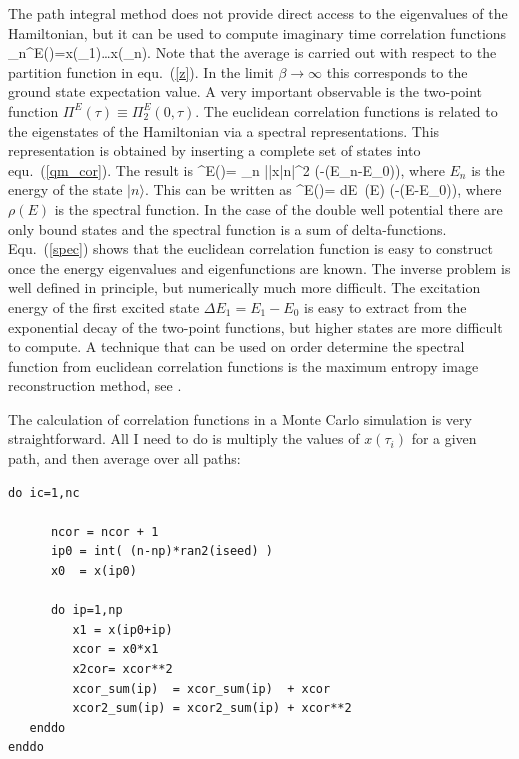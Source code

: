  The path integral method does not provide direct access to the eigenvalues
of the Hamiltonian, but it can be used to compute imaginary time correlation
functions
\be
\label{qm_cor}
 \Pi_n^E(\tau)=\langle x(\tau_1)\ldots x(\tau_n)\rangle.
\ee
Note that the average is carried out with respect to the partition 
function in equ.~(\ref{z}). In the limit $\beta\to\infty$ this 
corresponds to the ground state expectation value. A very important 
observable is the two-point function $\Pi^E(\tau)\equiv \Pi^E_2(0,\tau)$. 
The euclidean correlation functions is related to the eigenstates of 
the Hamiltonian via a spectral representations. This representation 
is obtained by inserting a complete set of states into 
equ.~(\ref{qm_cor}). The result is
\be 
\label{spec}
\Pi^E(\tau)= \sum_n ||x|n\rangle|^2 
 \exp(-(E_n-E_0)\tau),
\ee
where $E_n$ is the energy of the state $|n\rangle$. This can be written as
\be
\Pi^E(\tau)= \int dE\, \rho(E) \exp(-(E-E_0)\tau),
\ee
where $\rho(E)$ is the spectral function. In the case of the double well
potential there are only bound states and the spectral function is a sum 
of delta-functions. Equ.~(\ref{spec}) shows that the euclidean correlation 
function is easy to construct once the energy eigenvalues and eigenfunctions 
are known. The inverse problem is well defined in principle, but numerically 
much more difficult. The excitation energy of the first excited state 
$\Delta E_1 = E_1-E_0$ is easy to extract from the exponential decay of the 
two-point functions, but higher states are more difficult to compute. A 
technique that can be used on order determine the spectral function from 
euclidean correlation functions is the maximum entropy image reconstruction 
method, see \cite{Jarrell:1996rrw,Asakawa:2000tr}.

 The calculation of correlation functions in a Monte Carlo simulation
is very straightforward. All I need to do is multiply the values of 
$x(\tau_i)$ for a given path, and then average over all paths:
 
\vspace*{0.3cm} 
\begin{lstlisting}
do ic=1,nc
            
      ncor = ncor + 1 
      ip0 = int( (n-np)*ran2(iseed) ) 
      x0  = x(ip0) 
            
      do ip=1,np
         x1 = x(ip0+ip)
         xcor = x0*x1
         x2cor= xcor**2
         xcor_sum(ip)  = xcor_sum(ip)  + xcor
         xcor2_sum(ip) = xcor2_sum(ip) + xcor**2
   enddo  
enddo
\end{lstlisting}

